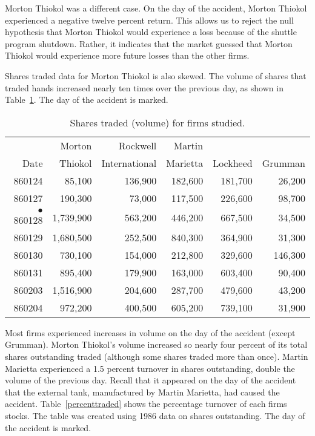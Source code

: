 Morton Thiokol was a different case.  On the day of the
accident, Morton Thiokol experienced a negative twelve
percent return.  This allows us to reject the null
hypothesis that Morton Thiokol would experience a loss
because of the shuttle program shutdown.  Rather, it
indicates that the market guessed that Morton Thiokol would
experience more future losses than the other firms.

Shares traded data for Morton Thiokol is also skewed.
The volume of shares that traded hands
increased nearly ten times over the previous day, as shown
in Table~\ref{volume}.  The day of the accident is marked.

\begin{table}[h!]
\caption{Shares traded (volume) for firms studied.}
\sffamily
\begin{tabular*}{6in}{r@{\extracolsep{1em}}rrrrr}
\hline\hline       
       &  Morton & Rockwell & Martin &          &         \\
Date   &  Thiokol & International & Marietta & Lockheed & Grumman \\
\hline
860124 & 85,100 & 136,900 & 182,600 & 181,700 & 26,200 \\
860127 & 190,300 & 73,000 & 117,500 & 226,600 & 98,700 \\
$\bullet$860128 & 1,739,900 & 563,200 & 446,200 & 667,500 & 34,500 \\
860129 & 1,680,500 & 252,500 & 840,300 & 364,900 & 31,300 \\
860130 & 730,100 & 154,000 & 212,800 & 329,600 & 146,300 \\
860131 & 895,400 & 179,900 & 163,000 & 603,400 & 90,400 \\
860203 & 1,516,900 & 204,600 & 287,700 & 479,600 & 43,200 \\
860204 & 972,200 & 400,500 & 605,200 & 739,100 & 31,900 \\ \hline
\end{tabular*}
\label{volume}
\end{table}

Most firms experienced increases in volume on the day of the
accident (except Grumman).  Morton Thiokol's volume
increased so nearly four percent of its total shares
outstanding traded (although some shares traded more than
once).  Martin Marietta experienced a 1.5 percent turnover
in shares outstanding, double the volume of the previous
day.  Recall that it appeared on the day of the accident
that the external tank, manufactured by Martin Marietta,  
had caused the accident.   Table~\ref{percenttraded} shows
the percentage turnover of each firms stocks.  The table was
created using 1986 data on shares outstanding.  The day of
the accident is marked.

